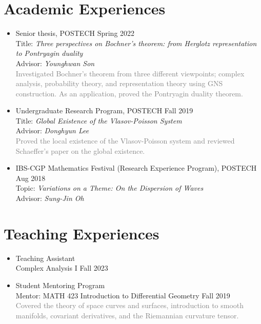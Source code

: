 \documentclass[11pt,a4paper]{article}
\begin{document}
\section*{Academic Experiences}
\begin{itemize}
\item
	Senior thesis, POSTECH
	\hfill{\small Spring 2022}\\
	Title: \emph{Three perspectives on Bochner's theorem: from Herglotz representation to Pontryagin duality}\\
	Advisor: \emph{Younghwan Son}\\
	\textcolor{gray}{Investigated Bochner's theorem from three different viewpoints; complex analysis, probability theory, and representation theory using GNS construction. As an application, proved the Pontryagin duality theorem.}

\item
	Undergraduate Research Program, POSTECH
	\hfill{\small Fall 2019}\\
	Title: \emph{Global Existence of the Vlasov-Poisson System}\\
	Advisor: \emph{Donghyun Lee}\\
	\textcolor{gray}{Proved the local existence of the Vlasov-Poisson system and reviewed Schaeffer's paper on the global existence.}
\item IBS-CGP Mathematics Festival (Research Experience Program), POSTECH
	\hfill{\small Aug 2018}\\
	Topic: \emph{Variations on a Theme: On the Dispersion of Waves}\\
	Advisor: \emph{Sung-Jin Oh}
\end{itemize}




\section*{Teaching Experiences}
\begin{itemize}
\item
	Teaching Assistant\\
	Complex Analysis I
	\hfill{\small Fall 2023}
\item
	Student Mentoring Program\\
	Mentor: MATH 423 Introduction to Differential Geometry
	\hfill{\small Fall 2019}\\
	\textcolor{gray}{Covered the theory of space curves and surfaces, introduction to smooth manifolds, covariant derivatives, and the Riemannian curvature tensor.}
\end{itemize}
\end{document}
